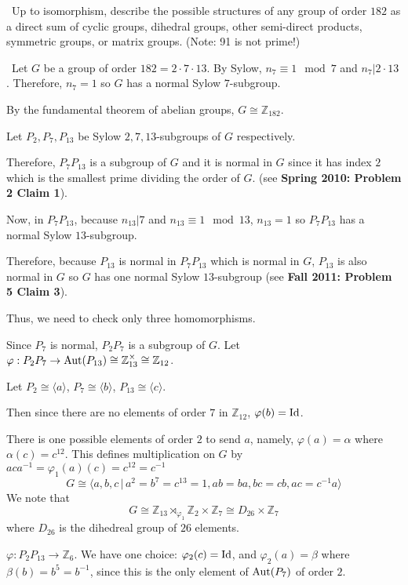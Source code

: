 \documentclass[12pt]{Qual}
\begin{document}
\begin{problem} $\,$
Up to isomorphism, describe the possible structures of any group of order $182$ as a direct sum of cyclic groups, dihedral groups, other semi-direct products, symmetric groups, or matrix groups. (Note: 91 is not prime!)
\end{problem}


\begin{solution}$\,$
Let $G$ be a group of order $182=2\cdot 7\cdot 13$. By Sylow, $n_7\equiv 1\mod 7$ and $n_7|2\cdot 13$. Therefore, $n_7=1$ so $G$ has a normal Sylow $7$-subgroup.

 By the fundamental theorem of abelian groups, $G\cong\mathbb{Z}_{182}.$

Let $P_2,P_7,P_{13}$ be Sylow $2,7,13$-subgroups of $G$ respectively.

Therefore, $P_7P_{13}$ is a subgroup of $G$ and it is normal in $G$ since it has index $2$ which is the smallest prime dividing the order of $G$. (see \textbf{Spring 2010: Problem 2 Claim 1}).

Now, in $P_7P_{13}$, because $n_{13}|7$ and $n_{13}\equiv 1\mod 13$, $n_{13}=1$ so $P_7P_{13}$ has a normal Sylow $13$-subgroup.

Therefore, because $P_{13}$ is normal in $P_7P_{13}$ which is normal in $G$, $P_{13}$ is also normal in $G$ so $G$ has one normal Sylow $13$-subgroup (see \textbf{Fall 2011: Problem 5 Claim 3}).

Thus, we need to check only three homomorphisms.

 Since $P_7$ is normal, $P_2P_7$ is a subgroup of $G$. Let $\varphi:P_2P_7\to\text{Aut}(P_{13})\cong\mathbb{Z}_{13}^\times\cong\mathbb{Z}_{12}$.

Let $P_2\cong\langle a\rangle$, $P_7\cong\langle b\rangle$, $P_{13}\cong\langle c\rangle$.

Then since there are no elements of order $7$ in $\mathbb{Z}_{12}$, $\varphi(b)=\text{Id}$.

There is one possible elements of order $2$ to send $a$, namely, $\varphi(a)=\alpha$ where $\alpha(c)=c^{12}$. This defines multiplication on $G$ by $aca^{-1}=\varphi_1(a)(c)=c^{12}=c^{-1}$ $$G\cong\langle a,b,c\,|\, a^2=b^7=c^{13}=1,ab=ba,bc=cb,ac=c^{-1}a\rangle$$ We note that $$G\cong \mathbb{Z}_{13}\rtimes_{\varphi_1}\mathbb{Z}_2\times\mathbb{Z}_7\cong D_{26}\times\mathbb{Z}_7$$ where $D_{26}$ is the dihedreal group of $26$ elements.


 $\varphi:P_2P_{13}\to\mathbb{Z}_6$. We have one choice: $\varphi_2(c)=\text{Id}$, and $\varphi_2(a)=\beta$ where $\beta(b)=b^5=b^{-1}$, since this is the only element of $\text{Aut}(P_7)$ of order $2$.


\end{solution}
\end{document}
